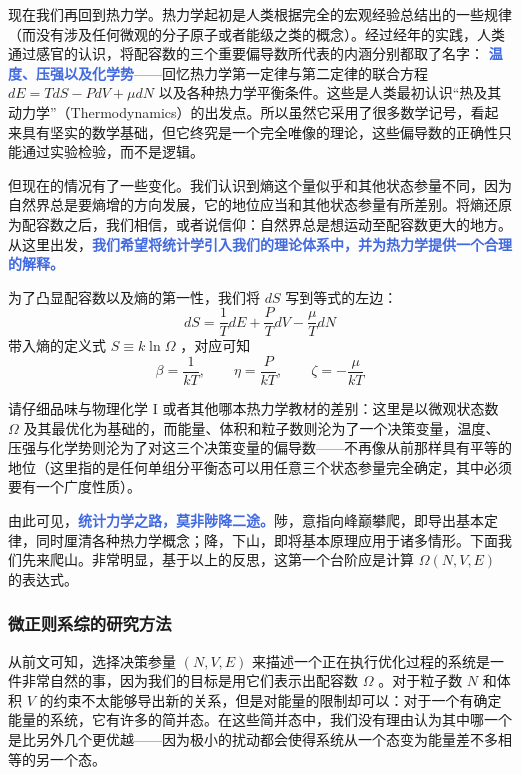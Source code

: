 \documentclass[hyperref,UTF-8]{ctexart}
\newcommand{\0}{\boldsymbol{0}}
\begin{document}
现在我们再回到热力学。热力学起初是人类根据完全的宏观经验总结出的一些规律（而没有涉及任何微观的分子原子或者能级之类的概念）。经过经年的实践，人类通过感官的认识，将配容数的三个重要偏导数所代表的内涵分别都取了名字： \textcolor{RoyalBlue}{\textbf{\kaishu 温度、压强以及化学势}}——回忆热力学第一定律与第二定律的联合方程 $dE = TdS - PdV+ \mu dN$ 以及各种热力学平衡条件。这些是人类最初认识“热及其动力学”（Thermodynamics）的出发点。所以虽然它采用了很多数学记号，看起来具有坚实的数学基础，但它终究是一个完全唯像的理论，这些偏导数的正确性只能通过实验检验，而不是逻辑。

但现在的情况有了一些变化。我们认识到熵这个量似乎和其他状态参量不同，因为自然界总是要熵增的方向发展，它的地位应当和其他状态参量有所差别。将熵还原为配容数之后，我们相信，或者说信仰：自然界总是想运动至配容数更大的地方。从这里出发，\textcolor{RoyalBlue}{\textbf{\kaishu 我们希望将统计学引入我们的理论体系中，并为热力学提供一个合理的解释。}} 

为了凸显配容数以及熵的第一性，我们将 $dS$ 写到等式的左边：
\begin{equation}
    dS = \frac{1}{T} dE + \frac{P}{T} dV - \frac{\mu}{T} dN
\end{equation}
带入熵的定义式 $S \equiv k\ln \Omega$ ，对应可知
\begin{equation}
    \beta = \frac{1}{kT} ,\quad\quad \eta = \frac{P}{kT} ,\quad\quad \zeta = -\frac{\mu}{kT} 
\end{equation}

请仔细品味与物理化学 I 或者其他哪本热力学教材的差别：这里是以微观状态数 $\Omega$ 及其最优化为基础的，而能量、体积和粒子数则沦为了一个决策变量，温度、压强与化学势则沦为了对这三个决策变量的偏导数——不再像从前那样具有平等的地位（这里指的是任何单组分平衡态可以用任意三个状态参量完全确定，其中必须要有一个广度性质）。

由此可见，\textcolor{RoyalBlue}{\textbf{\kaishu 统计力学之路，莫非陟降二途。}}陟，意指向峰巅攀爬，即导出基本定律，同时厘清各种热力学概念；降，下山，即将基本原理应用于诸多情形。下面我们先来爬山。非常明显，基于以上的反思，这第一个台阶应是计算 $\Omega (N,V,E)$ 的表达式。 


\subsubsection{微正则系综的研究方法}

从前文可知，选择决策参量 $(N,V,E)$ 来描述一个正在执行优化过程的系统是一件非常自然的事，因为我们的目标是用它们表示出配容数 $\Omega$ 。对于粒子数 $N$ 和体积 $V$ 的约束不太能够导出新的关系，但是对能量的限制却可以：对于一个有确定能量的系统，它有许多的简并态。在这些简并态中，我们没有理由认为其中哪一个是比另外几个更优越——因为极小的扰动都会使得系统从一个态变为能量差不多相等的另一个态。
\end{document}
